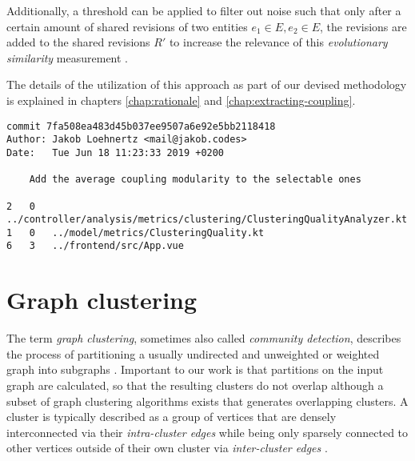 \documentclass[12pt,a4paper]{report}
\begin{document}
Additionally, a threshold can be applied to filter out noise such that only
after a certain amount of shared revisions of two entities \(e_1 \in E, e_2 \in E\),
the revisions are added to the shared revisions \(R'\) to increase the relevance
of this \textit{evolutionary similarity} measurement \cite{tornhill2015crimescene}.

The details of the utilization of this approach as part of our devised methodology
is explained in chapters \ref{chap:rationale} and \ref{chap:extracting-coupling}.

\smaller
\begin{lstlisting}[caption=Example Git log, label=git-log, breaklines=true]
commit 7fa508ea483d45b037ee9507a6e92e5bb2118418
Author: Jakob Loehnertz <mail@jakob.codes>
Date:   Tue Jun 18 11:23:33 2019 +0200

    Add the average coupling modularity to the selectable ones

2   0   ../controller/analysis/metrics/clustering/ClusteringQualityAnalyzer.kt
1   0   ../model/metrics/ClusteringQuality.kt
6   3   ../frontend/src/App.vue
\end{lstlisting}
\normalsize



\section{Graph clustering} \label{sect:background-graph-clustering}

The term \textit{graph clustering}, sometimes also called \textit{community detection},
describes the process of partitioning a usually undirected
and unweighted or weighted graph into subgraphs \cite{lancichinetti2009community}.
Important to our work is that partitions on the input graph are calculated,
so that the resulting clusters do not overlap although a subset of
graph clustering algorithms exists that generates overlapping clusters.
A cluster is typically described as a group of vertices that are densely
interconnected via their \textit{intra-cluster edges} while being only sparsely
connected to other vertices outside of their own cluster via
\textit{inter-cluster edges} \cite{lancichinetti2009community, newman2004fast}.
\end{document}
